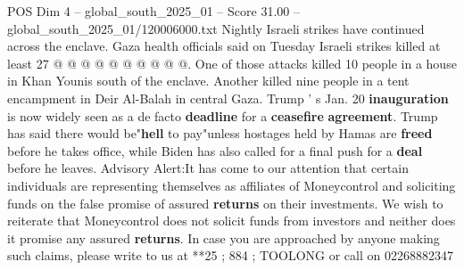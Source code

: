 \begin{textsample}{POS Dim 4 – global\_south\_2025\_01 – Score 31.00 – global\_south\_2025\_01/120006000.txt}
Nightly Israeli strikes have continued across the enclave.
Gaza health officials said on Tuesday Israeli strikes killed at least 27 @ @ @ @ @ @ @ @ @ @.
One of those attacks killed 10 people in a house in Khan Younis south of the enclave.
Another killed nine people in a tent encampment in Deir Al-Balah in central Gaza.
Trump ' s Jan. 20 \textbf{inauguration} is now widely seen as a de facto \textbf{deadline} for a \textbf{ceasefire} \textbf{agreement}.
Trump has said there would be"\textbf{hell} to pay"unless hostages held by Hamas are \textbf{freed} before he takes office, while Biden has also called for a final push for a \textbf{deal} before he leaves.
Advisory Alert:It has come to our attention that certain individuals are representing themselves as affiliates of Moneycontrol and soliciting funds on the false promise of assured \textbf{returns} on their investments.
We wish to reiterate that Moneycontrol does not solicit funds from investors and neither does it promise any assured \textbf{returns}.
In case you are approached by anyone making such claims, please write to us at **25 ; 884 ; TOOLONG or call on 02268882347

\end{textsample}
